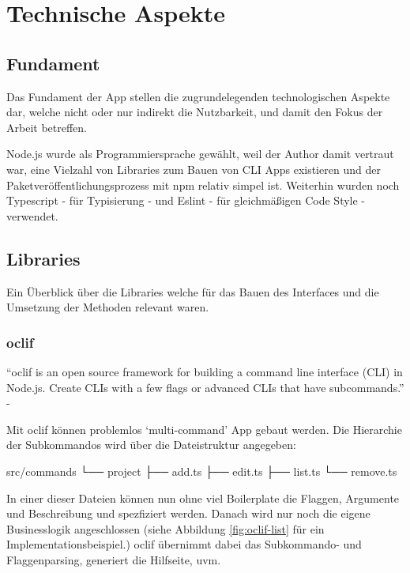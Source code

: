 \documentclass[oneside,bibliography=totocnumbered,BCOR=5mm]{scrbook}
\newenvironment{code}{\captionsetup{type=listing, skip=0pt}}{}
\begin{document}
\section{Technische Aspekte}
\subsection{Fundament}

Das Fundament der App stellen die zugrundelegenden technologischen Aspekte dar,
welche nicht oder nur indirekt die Nutzbarkeit, und damit den Fokus der Arbeit
betreffen.

Node.js wurde als Programmiersprache gewählt, weil der Author damit vertraut
war, eine Vielzahl von Libraries zum Bauen von CLI Apps existieren und der
Paketveröffentlichungsprozess mit npm relativ simpel ist. Weiterhin wurden noch
Typescript - für Typisierung - und Eslint - für gleichmäßigen Code Style -
verwendet.

\subsection{Libraries}

Ein Überblick über die Libraries welche für das Bauen des Interfaces und die
Umsetzung der Methoden relevant waren.

\subsubsection{oclif}
\label{sec:oclif}

``oclif is an open source framework for building a command line interface
(CLI) in Node.js. Create CLIs with a few flags or advanced CLIs that have
subcommands.'' - \textcite{oclif}

Mit oclif können problemlos `multi-command' App gebaut werden. Die Hierarchie
der Subkommandos wird über die Dateistruktur angegeben:

\begin{code}
  \begin{shellcode}
 src/commands
 └── project
     ├── add.ts
     ├── edit.ts
     ├── list.ts
     └── remove.ts
  \end{shellcode}
  \medskip
\end{code}

In einer dieser Dateien können nun ohne viel Boilerplate die Flaggen,
Argumente und Beschreibung und spezfiziert werden. Danach wird nur noch die
eigene Businesslogik angeschlossen (siehe Abbildung \ref{fig:oclif-list} für
ein Implementationsbeispiel.) oclif übernimmt dabei das Subkommando- und
Flaggenparsing, generiert die Hilfseite, uvm.
\end{document}
